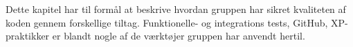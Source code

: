 Dette kapitel har til formål at beskrive hvordan gruppen har sikret kvaliteten af koden gennem forskellige tiltag. 
Funktionelle- og integrations tests, GitHub, XP-praktikker er blandt nogle af de værktøjer gruppen har anvendt hertil.